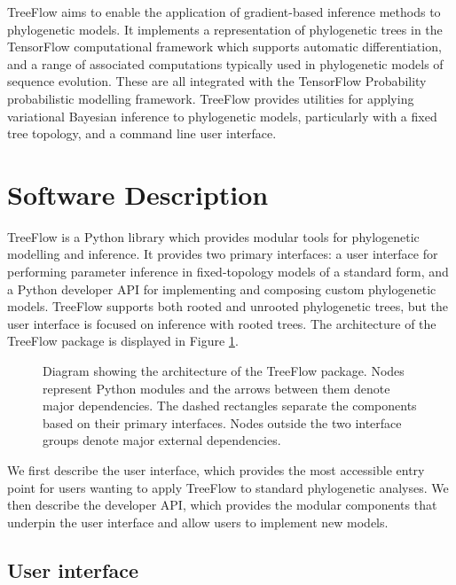 \documentclass{article}
\begin{document}
TreeFlow aims to enable the application of gradient-based inference methods to phylogenetic models. It implements a representation of phylogenetic trees in the TensorFlow computational framework which supports automatic differentiation, and a range of associated computations typically used in phylogenetic models of sequence evolution. These are all integrated with the TensorFlow Probability probabilistic modelling framework. TreeFlow provides utilities for applying variational Bayesian inference to phylogenetic models, particularly with a fixed tree topology, and a command line user interface.

\section{Software Description}

TreeFlow is a Python library which provides modular tools for phylogenetic modelling and inference. It provides two primary interfaces: a user interface for performing parameter inference in fixed-topology models of a standard form, and a Python developer API for implementing and composing custom phylogenetic models. TreeFlow supports both rooted and unrooted phylogenetic trees, but the user interface is focused on inference with rooted trees. The architecture of the TreeFlow package is displayed in Figure \ref{fig:architecture}.

\newlength{\originalbaselineskip}
\setlength{\originalbaselineskip}{\baselineskip}

\begin{figure}
    \centering
    
    \caption{Diagram showing the architecture of the TreeFlow package. Nodes represent Python modules and the arrows between them denote major dependencies. The dashed rectangles separate the components based on their primary interfaces. Nodes outside the two interface groups denote major external dependencies.}
    \label{fig:architecture}
\end{figure}

\setlength{\baselineskip}{\originalbaselineskip}

We first describe the user interface, which provides the most accessible entry point for users wanting to apply TreeFlow to standard phylogenetic analyses. We then describe the developer API, which provides the modular components that underpin the user interface and allow users to implement new models.

\subsection{User interface}
\end{document}
